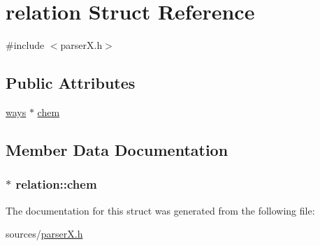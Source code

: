 \hypertarget{structrelation}{\section{relation Struct Reference}
\label{structrelation}
}


{\ttfamily \#include $<$parser\-X.\-h$>$}

\subsection*{Public Attributes}
\begin{DoxyCompactItemize}
\item 
\hyperlink{structways}{ways} $\ast$ \hyperlink{structrelation_a77c5f22a034e5d10796f7fffba97c713}{chem}
\end{DoxyCompactItemize}


\subsection{Member Data Documentation}
\hypertarget{structrelation_a77c5f22a034e5d10796f7fffba97c713}{
\subsubsection[{chem}]{$\ast$ relation\-::chem}}\label{structrelation_a77c5f22a034e5d10796f7fffba97c713}


The documentation for this struct was generated from the following file\-:\begin{DoxyCompactItemize}
\item 
sources/\hyperlink{parser_x_8h}{parser\-X.\-h}\end{DoxyCompactItemize}
